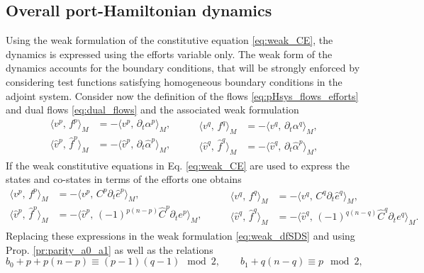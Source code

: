 \documentclass{elsarticle}
\newcommand*{\dual}[1]{\ensuremath{\widehat{#1}}}
\newcommand{\inpr}[3][]{\ensuremath{\langle #2, \, #3 \rangle_{#1}}}
\begin{document}
\subsection{Overall port-Hamiltonian dynamics} 
Using the weak formulation of the constitutive equation \eqref{eq:weak_CE}, the dynamics is expressed using the efforts variable only. The weak form of the dynamics accounts for the boundary conditions, that will be strongly enforced by considering test functions satisfying homogeneous boundary conditions in the adjoint system. Consider now the definition of the flows \eqref{eq:pHsys_flows_efforts} and dual flows \eqref{eq:dual_flows} and the associated weak formulation
\begin{equation}
    \begin{aligned}
    \inpr[M]{v^p}{f^p} &= -\inpr[M]{v^p}{\partial_t \alpha^p}, \\
    \inpr[M]{\dual{v}^p}{\dual{f}^p} &= -\inpr[M]{\dual{v}^p}{\partial_t \dual{\alpha}^p}, \\
    \end{aligned} \qquad
    \begin{aligned}
    \inpr[M]{v^q}{f^q} &= -\inpr[M]{v^q}{\partial_t \alpha^q}, \\
    \inpr[M]{\dual{v}^q}{\dual{f}^q} &= -\inpr[M]{\dual{v}^q}{\partial_t \dual{\alpha}^p},
    \end{aligned}
\end{equation}
If the weak constitutive equations in Eq. \eqref{eq:weak_CE} are used to express the states and co-states in terms of the efforts one obtains
\begin{equation}
    \begin{aligned}
    \inpr[M]{v^p}{f^p} &= -\inpr[M]{v^p}{C^p \partial_t \dual{e}^p}, \\
    \inpr[M]{\dual{v}^p}{\dual{f}^p} &= -\inpr[M]{\dual{v}^p}{(-1)^{p(n-p)} \dual{C}^p\partial_t e^p}, \\
    \end{aligned} \qquad
    \begin{aligned}
    \inpr[M]{v^q}{f^q} &= -\inpr[M]{v^q}{C^q \partial_t \dual{e}^q}, \\
    \inpr[M]{\dual{v}^q}{\dual{f}^q} &= -\inpr[M]{\dual{v}^q}{(-1)^{q(n-q)} \dual{C}^q\partial_t e^q}.
    \end{aligned}
\end{equation}
Replacing these expressions in the weak formulation \eqref{eq:weak_dfSDS} and
 using Prop. \ref{pr:parity_a0_a1} as well as the relations 
\begin{equation}
    b_0 + p + p(n-p) \equiv (p-1)(q-1) \mod 2, \qquad 
        b_1 + q(n-q) \equiv p \mod 2, 
\end{equation}
\end{document}
